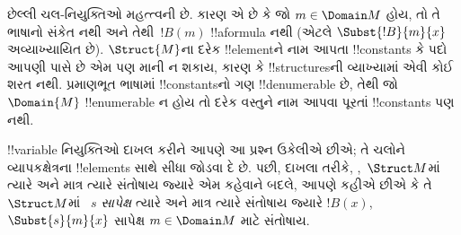 \documentclass[../../../include/open-logic-section]{subfiles}
\begin{document}
\begin{explain}
છેલ્લી  ચલ-નિયુક્તિઓ
મહત્ત્વની છે. કારણ એ છે કે જો $m \in \Domain M$ હોય,
તો તે ભાષાનો સંકેત નથી અને તેથી~$!B(m)$ !!a{formula} નથી (એટલે
$\Subst{!B}{m}{x}$ અવ્યાખ્યાયિત છે). $\Struct{M}$ના દરેક !!{element}ને
નામ આપતા !!{constant}s કે પદો આપણી પાસે છે એમ પણ માની ન શકાય, કારણ
કે !!{structure}sની વ્યાખ્યામાં એવી કોઈ શરત નથી. પ્રમાણભૂત ભાષામાં
!!{constant}sનો ગણ !!{denumerable} છે, તેથી જો $\Domain{M}$
!!{enumerable} ન હોય તો દરેક વસ્તુને નામ આપવા પૂરતાં !!{constant}s પણ
નથી.

!!{variable} નિયુક્તિઓ દાખલ કરીને આપણે આ પ્રશ્ન ઉકેલીએ છીએ; તે ચલોને વ્યાપકક્ષેત્રના
!!{element}s સાથે સીધા જોડવા દે છે. પછી, દાખલા તરીકે,
,~$\Struct M$માં
ત્યારે અને માત્ર ત્યારે સંતોષાય જ્યારે
 એમ કહેવાને બદલે, આપણે કહીએ છીએ કે તે~$\Struct M$માં
~$s$ \emph{સાપેક્ષ} ત્યારે અને માત્ર ત્યારે સંતોષાય જ્યારે
$!B(x)$,~$\Subst{s}{m}{x}$ સાપેક્ષ  $m \in \Domain M$ માટે સંતોષાય.
\end{explain}
\end{document}

